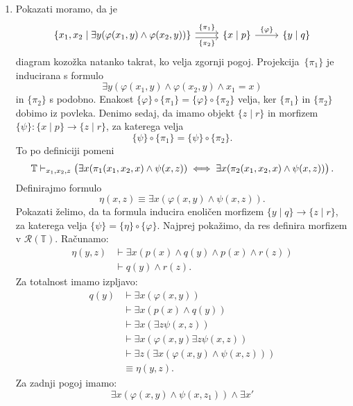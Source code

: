 \documentclass[../kategoricna_logika.tex]{subfiles}
\begin{document}
\begin{dokaz}
\begin{enumerate}[label=(\roman*)]
  \item Pokazati moramo, da je
    \begin{equation*}
      \begin{tikzcd}
        \{ x_1,x_2 \mid \exists y(\varphi(x_1,y) \land \varphi(x_2,y))
        \} \ar[r, shift left, "\{\pi_1\}"] \ar[r, shift right,
        "\{\pi_2\}"'] & \{x \mid p\} \ar[r, "\{\varphi\}"] & \{y \mid
        q\}
      \end{tikzcd}
    \end{equation*}
    diagram kozožka natanko takrat, ko velja zgornji pogoj.
    Projekcija~$\{\pi_1\}$ je inducirana s formulo
    \[\exists y(\varphi(x_1,y) \land \varphi(x_2,y) \land x_1 = x )\]
    in $\{\pi_2\}$ s podobno.  Enakost
    $\{\varphi\} \circ \{\pi_1\} = \{ \varphi\} \circ \{\pi_2\}$
    velja, ker $\{\pi_1\}$ in $\{\pi_2\}$ dobimo iz povleka. Denimo
    sedaj, da imamo objekt $\{ z \mid r\}$ in morfizem
    $\{\psi\} : \{ x \mid p\} \to \{ z \mid r\}$, za katerega velja
    \[\{\psi\} \circ \{\pi_1\} = \{\psi\} \circ \{\pi_2\}.\]
    To po definiciji pomeni
    \[ \mathbb{T} \vdash_{x_1,x_2,z} \left(\exists x (\pi_1(x_1,x_2,x) \land
        \psi(x,z)) \iff \exists x (\pi_2(x_1,x_2,x) \land
        \psi(x,z))\right).
    \]
    Definirajmo formulo
    \[ \eta(x,z) \equiv \exists x(\varphi(x,y) \land \psi(x,z)).\]
    Pokazati želimo, da ta formula inducira enoličen morfizem
    ${\{y \mid q\} \to \{z \mid r\}}$, za katerega velja
    $\{\psi\} = \{ \eta\} \circ \{\varphi\}$.  Najprej pokažimo, da
    res definira morfizem v $\mathcal{R}(\mathbb{T})$. Računamo:
    \begin{align*}
      \eta(y,z) &\vdash \exists x(p(x) \land q(y) \land p(x) \land r(z)) \\
                &\vdash q(y) \land r(z).
    \end{align*}
    Za totalnost imamo izpljavo:
    \begin{align*}
      q(y) &\vdash\exists x(\varphi(x,y)) \\
           &\vdash \exists x(p(x) \land q(y)) \\
           &\vdash \exists x (\exists z \psi(x,z)) \\
           &\vdash \exists x(\varphi(x,y) \exists z \psi(x,z)) \\
           &\vdash \exists z ( \exists x(\varphi(x,y) \land \psi(x,z))) \\
           &\equiv \eta(y,z).
    \end{align*}
    Za zadnji pogoj imamo:
    \[ \exists x(\varphi(x,y) \land \psi(x,z_1)) \land \exists x'
\]
\end{enumerate}
\end{dokaz}
\end{document}
